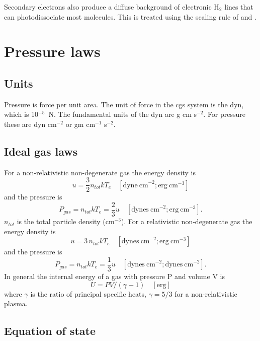 Secondary electrons also produce a diffuse background of electronic H$_2$
lines that can photodissociate most molecules.
This is treated using the
scaling rule of \citep{Gredel1987} and \citet{Gredel1989}.

\section{Pressure laws}

\subsection{Units}

Pressure is force per unit area.  The unit of force in the cgs
system is the dyn, which is 10$^{-5}$~N.  The fundamental units of the dyn are
g cm s$^{-2}$.  For pressure these are dyn cm$^{-2}$ or gm cm$^{-1}$
s$^{-2}$.

\subsection{Ideal gas laws}

For a non-relativistic non-degenerate gas the energy density is
\begin{equation}
u = \frac{3}{2}{n_{tot}}k{T_e}
\quad [\mathrm{dyne~cm}^{-2}; \mathrm{erg~cm}^{-3}]
\end{equation}
and the pressure is
\begin{equation}
{P_{gas}} = {n_{tot}}k{T_e} = \frac{2}{3}u
\quad  [\mathrm{dynes~cm}^{-2}; \mathrm{erg~cm}^{-3}].
\end{equation}
$n_{tot}$ is the total particle density (cm$^{-3}$).  For a relativistic non-degenerate
gas the energy density is
\begin{equation}
u = 3\,{n_{tot}}k{T_e}
\quad [\mathrm{dynes~cm}^{-2}; \mathrm{erg~cm}^{-3}]
\end{equation}
and the pressure is
\begin{equation}
{P_{gas}} = {n_{tot}}k{T_e} = \frac{1}{3}u
\quad [\mathrm{dynes~cm}^{-2}; \mathrm{dynes~ cm}^{-2}].
\end{equation}
In general the internal energy of a gas with pressure P and volume V is
\begin{equation}
U = PV/\left( {\gamma  - 1} \right)
\quad [\mathrm{erg}]
\end{equation}
where $\gamma$ is the ratio of principal specific heats, $\gamma = 5/3$ for a
non-relativistic plasma.

\subsection{Equation of state}

